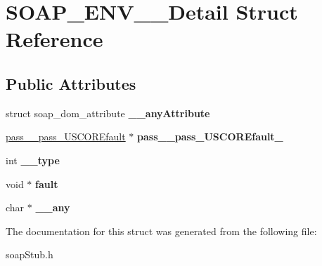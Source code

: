 \hypertarget{structSOAP__ENV____Detail}{
\section{SOAP\_\-ENV\_\-\_\-Detail Struct Reference}
\label{structSOAP__ENV____Detail}
}
\subsection*{Public Attributes}
\begin{DoxyCompactItemize}
\item 
\hypertarget{structSOAP__ENV____Detail_ac526693039997f44cdf92eb80f1880d3}{
struct soap\_\-dom\_\-attribute {\bfseries \_\-\_\-anyAttribute}}
\label{structSOAP__ENV____Detail_ac526693039997f44cdf92eb80f1880d3}

\item 
\hypertarget{structSOAP__ENV____Detail_a848ba06694a233e0a9c6f1a66731b20b}{
\hyperlink{classpass____pass__USCOREfault}{pass\_\-\_\-pass\_\-USCOREfault} $\ast$ {\bfseries pass\_\-\_\-pass\_\-USCOREfault\_\-}}
\label{structSOAP__ENV____Detail_a848ba06694a233e0a9c6f1a66731b20b}

\item 
\hypertarget{structSOAP__ENV____Detail_ae21be5af0f3f6dc47f2dbf4e35e22300}{
int {\bfseries \_\-\_\-type}}
\label{structSOAP__ENV____Detail_ae21be5af0f3f6dc47f2dbf4e35e22300}

\item 
\hypertarget{structSOAP__ENV____Detail_a159d344759c06f82eae1949aea10a1cf}{
void $\ast$ {\bfseries fault}}
\label{structSOAP__ENV____Detail_a159d344759c06f82eae1949aea10a1cf}

\item 
\hypertarget{structSOAP__ENV____Detail_aec8be27bbc4e83f9f8d7ea97c034f822}{
char $\ast$ {\bfseries \_\-\_\-any}}
\label{structSOAP__ENV____Detail_aec8be27bbc4e83f9f8d7ea97c034f822}

\end{DoxyCompactItemize}


The documentation for this struct was generated from the following file:\begin{DoxyCompactItemize}
\item 
soapStub.h\end{DoxyCompactItemize}

